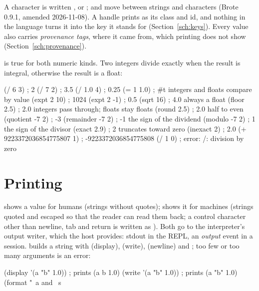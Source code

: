 A character is written ,  or
;  and 
move between strings and characters (Brote 0.9.1,  amended
2026-11-08). A handle prints as
its class and id, and nothing in the language turns it into the key it
stands for (Section~\ref{sch:keys}). Every value also carries
\emph{provenance tags}, where it came from, which printing does not show
(Section~\ref{sch:provenance}).

 is true for both numeric kinds. Two integers divide exactly
when the result is integral, otherwise the result is a float:

\begin{scm}
(/ 6 3)            ; 2
(/ 7 2)            ; 3.5
(/ 1.0 4)          ; 0.25
(= 1 1.0)          ; #t    integers and floats compare by value
(expt 2 10)        ; 1024
(expt 2 -1)        ; 0.5
(sqrt 16)          ; 4.0   always a float
(floor 2.5)        ; 2.0   integers pass through; floats stay floats
(round 2.5)        ; 2.0   half to even
(quotient -7 2)    ; -3
(remainder -7 2)   ; -1    the sign of the dividend
(modulo -7 2)      ; 1     the sign of the divisor
(exact 2.9)        ; 2     truncates toward zero
(inexact 2)        ; 2.0
(+ 9223372036854775807 1)   ; -9223372036854775808
(/ 1 0)            ; error: /: division by zero
\end{scm}

\section{Printing}

 shows a value for humans (strings without quotes);
 shows it for machines (strings quoted and escaped so that the
reader can read them back; a control character other than newline, tab and
return is written as ). Both go to the
interpreter's output writer, which the host provides: stdout in the REPL,
an \emph{output} event in a session.  builds a string with
 (display),  (write),
\code{\textasciitilde\%} (newline) and
\code{\textasciitilde\textasciitilde}; too few or too many arguments is an
error:

\begin{scm}
(display '(a "b" 1.0))           ; prints (a b 1.0)
(write '(a "b" 1.0))             ; prints (a "b" 1.0)
(format "~a and ~s~%
\end{scm}

